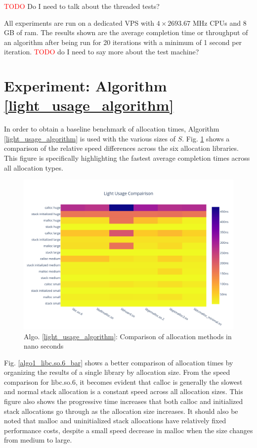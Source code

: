 \documentclass[letterpaper, 10 pt, conference]{ieeeconf}  %
\newcommand*\todo[0]{\textcolor{red}{TODO }}
\begin{document}
\todo Do I need to talk about the threaded tests?

All experiments are run on a dedicated VPS with $4 \times 2693.67$ MHz CPUs and $8$GB of ram.
The results shown are the average completion time or throughput of an algorithm after being run for 20 iterations with a minimum of 1 second per iteration.
\todo do I need to say more about the test machine?

\section{Experiment: Algorithm \ref{light_usage_algorithm}}
In order to obtain a baseline benchmark of allocation times, Algorithm \ref{light_usage_algorithm} is used with the various sizes of $S$.
Fig. \ref{algo1_complete_hist} shows a comparison of the relative speed differences across the six allocation libraries.
This figure is specifically highlighting the fastest average completion times across all allocation types.

\begin{figure}[tbh!]
  \centering
  \includegraphics[width=\columnwidth]{graphs/light_hist.png}
  \caption{ Algo. \ref{light_usage_algorithm}: Comparison of allocation methods in nano seconds }
  \label{algo1_complete_hist}
\end{figure} 


Fig. \ref{algo1_libc.so.6_bar} shows a better comparison of allocation times by organizing the results of a single library by allocation size.
From the speed comparison for libc.so.6, it becomes evident that calloc is generally the slowest and normal stack allocation is a constant speed across all allocation sizes.
This figure also shows the progressive time increases that both calloc and initialized stack allocations go through as the allocation size increases.
It should also be noted that malloc and uninitialized stack allocations have relatively fixed performance costs, despite a small speed decrease in malloc when the size changes from medium to large.
\end{document}
